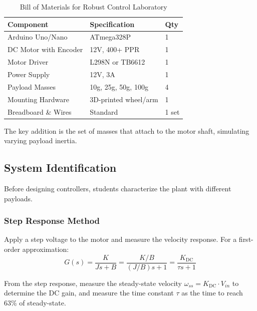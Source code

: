 \begin{table}[htbp]
\centering
\caption{Bill of Materials for Robust Control Laboratory}
\label{tab:robust_bom}
\begin{tabular}{lll}
\toprule
\textbf{Component} & \textbf{Specification} & \textbf{Qty} \\
\midrule
Arduino Uno/Nano & ATmega328P & 1 \\
DC Motor with Encoder & 12V, 400+ PPR & 1 \\
Motor Driver & L298N or TB6612 & 1 \\
Power Supply & 12V, 3A & 1 \\
Payload Masses & 10g, 25g, 50g, 100g & 4 \\
Mounting Hardware & 3D-printed wheel/arm & 1 \\
Breadboard \& Wires & Standard & 1 set \\
\bottomrule
\end{tabular}
\end{table}

The key addition is the set of masses that attach to the motor shaft, simulating varying payload inertia.

\subsection{System Identification}

Before designing controllers, students characterize the plant with different payloads.

\subsubsection{Step Response Method}

Apply a step voltage to the motor and measure the velocity response. For a first-order approximation:
\begin{equation}
G(s) = \frac{K}{Js + B} = \frac{K/B}{(J/B)s + 1} = \frac{K_{\text{DC}}}{\tau s + 1}
\end{equation}

From the step response, measure the steady-state velocity $\omega_{ss} = K_{\text{DC}} \cdot V_{in}$ to determine the DC gain, and measure the time constant $\tau$ as the time to reach 63\% of steady-state.

